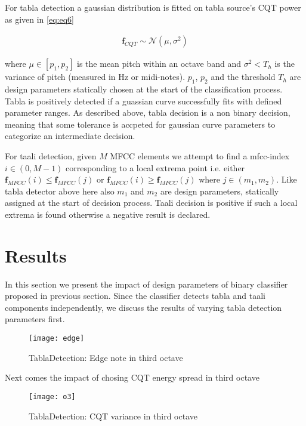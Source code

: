 \documentclass{article}
\begin{document}
For tabla detection a gaussian distribution is fitted on tabla source's CQT power as given in \ref{eq:eq6}

\begin{align}\label{eq:eq8}
\boldsymbol{f}_{CQT} \sim \mathcal{N}(\mu, \sigma^{2})
\end{align}

where $\mu \in [p_{1}, p_{2}]$ is the mean pitch within an octave band and $\sigma^{2} < T_{h}$ is the variance of pitch (measured in Hz or midi-notes). $p_{1}$, $p_{2}$ and the threshold $T_{h}$ are design parameters statically chosen at the start of the classification process. Tabla is positively detected if a guassian curve successfully fits with defined parameter ranges. As described above, tabla decision is a non binary decision, meaning that some tolerance is accpeted for gaussian curve parameters to categorize an intermediate decision.

For taali detection, given $M$ MFCC elements we attempt to find a mfcc-index $i \in (0, M-1)$ corresponding to a local extrema point i.e. either $\boldsymbol{f}_{MFCC}(i) \leq \boldsymbol{f}_{MFCC}(j)$ or $\boldsymbol{f}_{MFCC}(i) \geq \boldsymbol{f}_{MFCC}(j)$ where $j \in (m_{1}, m_{2})$. Like tabla detector above here also $m_{1}$ and $m_{2}$ are design parameters, statically assigned at the start of decision process. Taali decision is positive if such a local extrema is found otherwise a negative result is declared.

\section{Results}\label{sec:result}

In this section we present the impact of design parameters of binary classifier proposed in previous section. Since the classifier detects tabla and taali components independently, we discuss the results of varying tabla detection parameters first.
\begin{figure}[htbp]
  \centering
  \texttt{[image: edge]}
  \caption{TablaDetection: Edge note in third octave}
\label{fig:src_edge}
\end{figure}

Next comes the impact of chosing CQT energy spread in third octave
\begin{figure}[htbp]
  \centering
  \texttt{[image: o3]}
  \caption{TablaDetection: CQT variance in third octave}
\label{fig:src_o3}
\end{figure}
\end{document}
